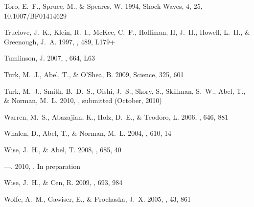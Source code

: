 \documentclass{PoS}
\begin{document}
\begin{thebibliography}{50}
Toro, E.~F., Spruce, M., \& Speares, W. 1994, Shock Waves, 4, 25,
  10.1007/BF01414629

{Truelove}, J.~K., {Klein}, R.~I., {McKee}, C.~F., {Holliman}, II, J.~H.,
  {Howell}, L.~H., \& {Greenough}, J.~A. 1997, \apjl, 489, L179+

{Tumlinson}, J. 2007, \apjl, 664, L63

{Turk}, M.~J., {Abel}, T., \& {O'Shea}, B. 2009, Science, 325, 601

{Turk}, M.~J., {Smith}, B.~D.~S., {Oishi}, J.~S., {Skory}, S., {Skillman},
  S.~W., {Abel}, T., \& {Norman}, M.~L. 2010, \apjs, submitted (October, 2010)

{Warren}, M.~S., {Abazajian}, K., {Holz}, D.~E., \& {Teodoro}, L. 2006, \apj,
  646, 881

{Whalen}, D., {Abel}, T., \& {Norman}, M.~L. 2004, \apj, 610, 14

{Wise}, J.~H., \& {Abel}, T. 2008, \apj, 685, 40

---. 2010, \apjs, In preparation

{Wise}, J.~H., \& {Cen}, R. 2009, \apj, 693, 984

{Wolfe}, A.~M., {Gawiser}, E., \& {Prochaska}, J.~X. 2005, \araa, 43, 861

\end{thebibliography}
\end{document}
